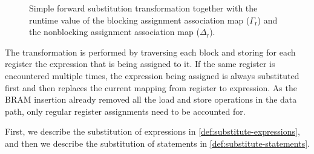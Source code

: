 \begin{figure}
  \caption{Simple forward substitution transformation together with the runtime
    value of the blocking assignment association map ($\Gamma_{\mathrm r}$) and
    the nonblocking assignment association map ($\Delta_{\mathrm r}$).}%
  \label{fig:hg:forward-substitution}
\end{figure}

\newcommand\substmap{t}
\newcommand\substexpr[2]{\texttt{subst\_expr}\ #1\ #2}
\newcommand\subststmnt[2]{\texttt{subst\_stmnt}\ #1\ #2}
\newcommand\invinsubstmap[4]{\texttt{in\_subst\_map}\ #1\ #2\ #3\ #4}
\newcommand\invnotinsubstmap[3]{\texttt{not\_in\_subst\_map}\ #1\ #2\ #3}

The transformation is performed by traversing each block and storing for each
register the expression that is being assigned to it.  If the same register is
encountered multiple times, the expression being assigned is always substituted
first and then replaces the current mapping from register to expression.  As the
BRAM insertion already removed all the load and store operations in the data
path, only regular register assignments need to be accounted for.

First, we describe the substitution of expressions in
\cref{def:substitute-expressions}, and then we describe the substitution of
statements in \cref{def:substitute-statements}.


